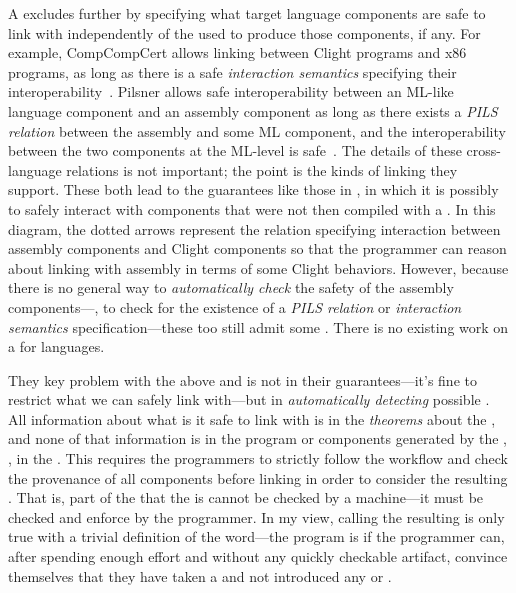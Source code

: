 \FigCompCompDiagram
A  excludes further  by
specifying what target language components are safe to link with independently
of the  used to produce those components, if any.
For example, CompCompCert allows linking between Clight programs and x86
programs, as long as there is a safe \emph{interaction semantics} specifying
their interoperability~\cite{stewart2015}.
Pilsner allows safe interoperability between an ML-like language component and
an assembly component as long as there exists a \emph{PILS relation} between the
assembly and some ML component, and the interoperability between the two
components at the ML-level is safe~\cite{neis2015:pilsner}.
The details of these cross-language relations is not important; the point is the
kinds of linking they support.
These both lead to the guarantees like those in
, in which it is possibly to safely
interact with components that were not  then compiled with a
.
In this diagram, the dotted arrows represent the relation specifying
interaction between assembly components and Clight components so that the
programmer can reason about linking with assembly in terms of some Clight
behaviors.
However, because there is no general way to \emph{automatically check} the
safety of the assembly components---\ie, to check for the existence of a
\emph{PILS relation} or \emph{interaction semantics} specification---these too
still admit some .
There is no existing work on a  for
 languages.

They key problem with the above  and
 is not in their guarantees---it's fine to
restrict what we can safely link with---but in \emph{automatically detecting}
possible .
All information about what is it safe to link with is in the
\emph{theorems} about the , and none of that information is in
the program or components generated by the , \ie, in the
.
This requires the programmers to strictly follow the workflow and check the
provenance of all components before linking in order to consider the resulting
 .
That is, part of the  that the  is 
cannot be checked by a machine---it must be checked and enforce by the
programmer.
%
In my view, calling the resulting   is only true
with a trivial definition of the word---the program is  if the
programmer can, after spending enough effort and without any quickly checkable
artifact, convince themselves that they have taken a  and
not introduced any  or .

